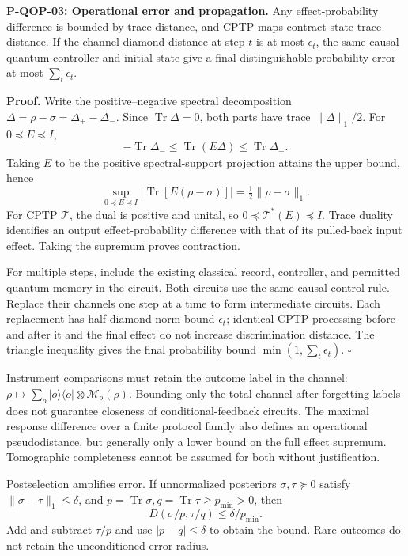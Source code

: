 \documentclass[
  11pt,
  oneside]{book}
\begin{document}
\label{p-qop-03}{}

\textbf{P-QOP-03: Operational error and propagation.} Any
effect-probability difference is bounded by trace distance, and CPTP
maps contract state trace distance. If the channel diamond distance at
step \(t\) is at most \(\epsilon_t\), the same causal quantum controller
and initial state give a final distinguishable-probability error at most
\(\sum_t\epsilon_t\).

\textbf{Proof.} Write the positive--negative spectral decomposition
\(\Delta=\rho-\sigma=\Delta_+-\Delta_-\). Since
\(\operatorname{Tr}\Delta=0\), both parts have trace \(\|\Delta\|_1/2\).
For \(0\preceq E\preceq I\), \[
-\operatorname{Tr}\Delta_-\le\operatorname{Tr}(E\Delta)
\le\operatorname{Tr}\Delta_+.
\] Taking \(E\) to be the positive spectral-support projection attains
the upper bound, hence \[
\sup_{0\preceq E\preceq I}|\operatorname{Tr}[E(\rho-\sigma)]|
=\tfrac12\|\rho-\sigma\|_1.
\] For CPTP \(\mathcal T\), the dual is positive and unital, so
\(0\preceq\mathcal T^*(E)\preceq I\). Trace duality identifies an output
effect-probability difference with that of its pulled-back input effect.
Taking the supremum proves contraction.

For multiple steps, include the existing classical record, controller,
and permitted quantum memory in the circuit. Both circuits use the same
causal control rule. Replace their channels one step at a time to form
intermediate circuits. Each replacement has half-diamond-norm bound
\(\epsilon_t\); identical CPTP processing before and after it and the
final effect do not increase discrimination distance. The triangle
inequality gives the final probability bound
\(\min(1,\sum_t\epsilon_t)\). \(\square\)

Instrument comparisons must retain the outcome label in the channel:
\(\rho\mapsto\sum_o|o\rangle\langle o|\otimes\mathcal M_o(\rho)\).
Bounding only the total channel after forgetting labels does not
guarantee closeness of conditional-feedback circuits. The maximal
response difference over a finite protocol family also defines an
operational pseudodistance, but generally only a lower bound on the full
effect supremum. Tomographic completeness cannot be assumed for both
without justification.

Postselection amplifies error. If unnormalized posteriors
\(\sigma,\tau\succeq0\) satisfy \(\|\sigma-\tau\|_1\le\delta\), and
\(p=\operatorname{Tr}\sigma,q=\operatorname{Tr}\tau\ge p_{\min}>0\),
then \[
D(\sigma/p,\tau/q)\le\delta/p_{\min}.
\] Add and subtract \(\tau/p\) and use \(|p-q|\le\delta\) to obtain the
bound. Rare outcomes do not retain the unconditioned error radius.
\end{document}
